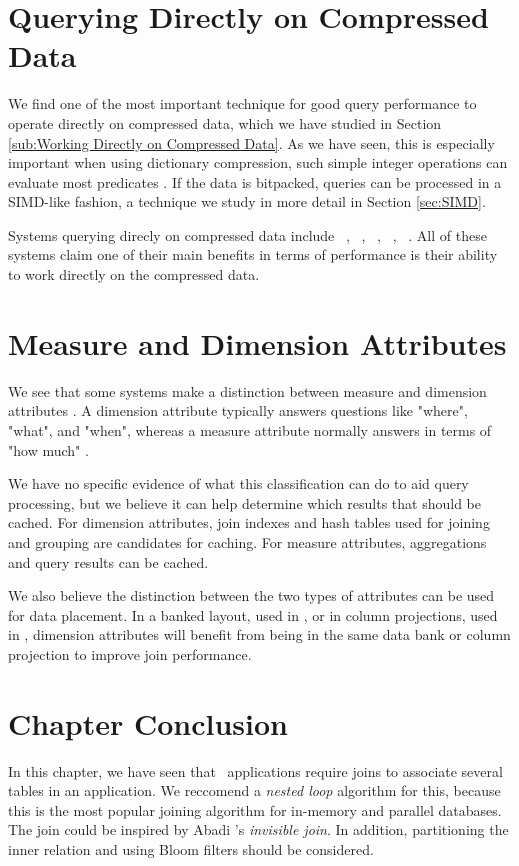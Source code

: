 \section{Querying Directly on Compressed Data}
\label{sec:Querying Directly on Compressed Data}
We find one of the most important technique for good query performance to operate directly on compressed data, which we have studied in Section \ref{sub:Working Directly on Compressed Data}. As we have seen, this is especially important when using dictionary compression, such simple integer operations can evaluate most predicates \cite{Abadi2008-dd}. If the data is bitpacked, queries can be processed in a SIMD-like fashion, a technique we study in more detail in Section \ref{sec:SIMD}.

Systems querying direcly on compressed data include \cstore~\cite{Stonebraker2005-qz}, \ibm~\cite{Raman2013-em}, \mssql~\cite{Larson2013-mc}, \blink~\cite{Johnson2008-cp}, \sapnw~\cite{Lemke2010-is}. All of these systems claim one of their main benefits in terms of performance is their ability to work directly on the compressed data.

\section{Measure and Dimension Attributes}
\label{sec:Measure and Dimension Attributes}
We see that some systems make a distinction between measure and dimension attributes \cite{Johnson2008-cp, Kamkolkar2015-iq}. A dimension attribute typically answers questions like "where", "what", and "when", whereas a measure attribute normally answers in terms of "how much" \cite{noauthor_undated-es}. 

We have no specific evidence of what this classification can do to aid query processing, but we believe it can help determine which results that should be cached. For dimension attributes, join indexes and hash tables used for joining and grouping are candidates for caching. For measure attributes, aggregations and query results can be cached.

We also believe the distinction between the two types of attributes can be used for data placement. In a banked layout, used in \blink, or in column projections, used in \cstore, dimension attributes will benefit from being in the same data bank or column projection to improve join performance.

\section{Chapter Conclusion}
\label{sec:Chapter Conclusion}
In this chapter, we have seen that \bd~applications require joins to associate several tables in an application. We reccomend a \textit{nested loop} algorithm for this, because this is the most popular joining algorithm for in-memory and parallel databases. The join could be inspired by Abadi \ea's \textit{invisible join}. In addition, partitioning the inner relation and using Bloom filters should be considered.

